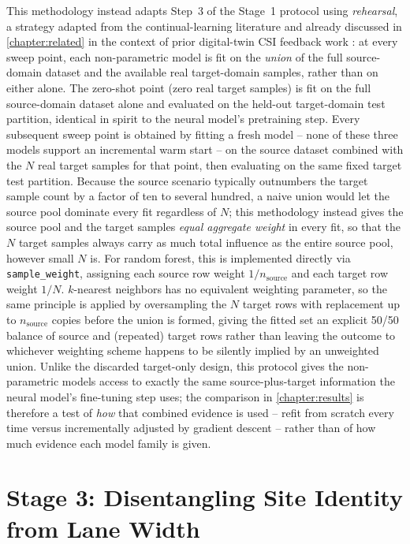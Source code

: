 \documentclass{iutbscthesis}
\begin{document}
This methodology instead adapts Step~3 of the Stage~1 protocol using \emph{rehearsal}, a strategy adapted from the continual-learning literature and already discussed in \autoref{chapter:related} in the context of prior digital-twin CSI feedback work \cite{robins1995catastrophic, jiang2024digitaltwincsi}: at every sweep point, each non-parametric model is fit on the \emph{union} of the full source-domain dataset and the available real target-domain samples, rather than on either alone. The zero-shot point (zero real target samples) is fit on the full source-domain dataset alone and evaluated on the held-out target-domain test partition, identical in spirit to the neural model's pretraining step. Every subsequent sweep point is obtained by fitting a fresh model -- none of these three models support an incremental warm start -- on the source dataset combined with the $N$ real target samples for that point, then evaluating on the same fixed target test partition. Because the source scenario typically outnumbers the target sample count by a factor of ten to several hundred, a naive union would let the source pool dominate every fit regardless of $N$; this methodology instead gives the source pool and the target samples \emph{equal aggregate weight} in every fit, so that the $N$ target samples always carry as much total influence as the entire source pool, however small $N$ is. For random forest, this is implemented directly via \texttt{sample\_weight}, assigning each source row weight $1/n_{\text{source}}$ and each target row weight $1/N$. $k$-nearest neighbors has no equivalent weighting parameter, so the same principle is applied by oversampling the $N$ target rows with replacement up to $n_{\text{source}}$ copies before the union is formed, giving the fitted set an explicit 50/50 balance of source and (repeated) target rows rather than leaving the outcome to whichever weighting scheme happens to be silently implied by an unweighted union. Unlike the discarded target-only design, this protocol gives the non-parametric models access to exactly the same source-plus-target information the neural model's fine-tuning step uses; the comparison in \autoref{chapter:results} is therefore a test of \emph{how} that combined evidence is used -- refit from scratch every time versus incrementally adjusted by gradient descent -- rather than of how much evidence each model family is given.

\section{Stage 3: Disentangling Site Identity from Lane Width}
\label{sec:stage3}
\end{document}
